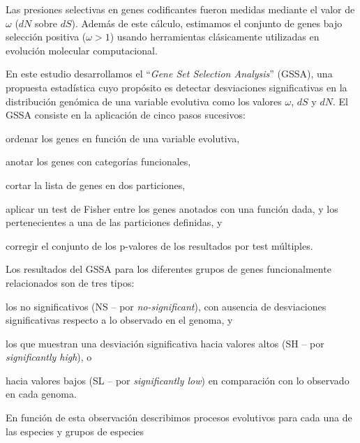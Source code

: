 Las presiones selectivas en genes codificantes fueron medidas mediante el valor de $\omega$ ($dN$ sobre $dS$). Además de este cálculo, estimamos el conjunto de genes bajo selección positiva ($\omega > 1$) usando herramientas clásicamente utilizadas en evolución molecular computacional.

En este estudio desarrollamos el ``\textit{Gene Set Selection Analysis}'' (GSSA), una propuesta estadística cuyo propósito es detectar desviaciones significativas en la distribución genómica de una variable evolutiva como los valores $\omega$, $dS$ y $dN$. El GSSA consiste en la aplicación de cinco pasos sucesivos:
\begin{inparaenum}[\bgroup\bfseries\em 1\egroup\it)]
\item ordenar los genes en función de una variable evolutiva,
\item anotar los genes con categorías funcionales,
\item cortar la lista de genes en dos particiones,
\item aplicar un test de Fisher entre los genes anotados con una función dada, y los pertenecientes a una de las particiones definidas, y
\item corregir el conjunto de los p-valores de los resultados por test múltiples.
\end{inparaenum}
Los resultados del GSSA para los diferentes grupos de genes funcionalmente relacionados son de tres tipos:
\begin{inparaenum}[\bgroup\bfseries\em 1\egroup\it)]
\item los no significativos (NS -- por \textit{no-significant}), con ausencia de desviaciones significativas respecto a lo observado en el genoma, y
\item los que muestran una desviación significativa hacia valores altos (SH -- por \textit{significantly high}), o
\item hacia valores bajos (SL -- por \textit{significantly low}) en comparación con lo observado en cada genoma.
\end{inparaenum}
En función de esta observación describimos procesos evolutivos para cada una de las especies y grupos de especies



